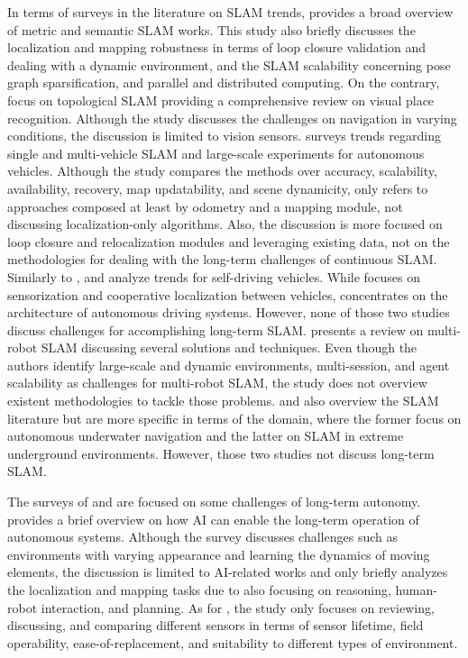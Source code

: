 In terms of surveys in the literature on SLAM trends, \cite{purpose:study:cadena:2016} provides a broad overview of metric and semantic SLAM works. This study also briefly discusses the localization and mapping robustness in terms of loop closure validation and dealing with a dynamic environment, and the SLAM scalability concerning pose graph sparsification, and parallel and distributed computing. On the contrary, \cite{purpose:study:lowry:2016} focus on topological SLAM providing a comprehensive review on visual place recognition. Although the study discusses the challenges on navigation in varying conditions, the discussion is limited to vision sensors.
\cite{purpose:study:bresson:2017} surveys trends regarding single and multi-vehicle SLAM and large-scale experiments for autonomous vehicles. Although the study compares the methods over accuracy, scalability, availability, recovery, map updatability, and scene dynamicity, \cite{purpose:study:bresson:2017} only refers to approaches composed at least by odometry and a mapping module, not discussing localization-only algorithms. Also, the discussion is more focused on loop closure and relocalization modules and leveraging existing data, not on the methodologies for dealing with the long-term challenges of continuous SLAM.
Similarly to \cite{purpose:study:bresson:2017}, \cite{purpose:study:kuutti:2018} and \cite{purpose:study:badue:2021} analyze trends for self-driving vehicles. While \cite{purpose:study:kuutti:2018} focuses on sensorization and cooperative localization between vehicles, \cite{purpose:study:badue:2021} concentrates on the architecture of autonomous driving systems. However, none of those two studies discuss challenges for accomplishing long-term SLAM.
\cite{purpose:study:saeedi:2016} presents a review on multi-robot SLAM discussing several solutions and techniques. Even though the authors identify large-scale and dynamic environments, multi-session, and agent scalability as challenges for multi-robot SLAM, the study does not overview existent methodologies to tackle those problems.
\cite{purpose:study:paull:2014} and \cite{purpose:study:ebadi} also overview the SLAM literature but are more specific in terms of the domain, where the former focus on autonomous underwater navigation and the latter on SLAM in extreme underground environments. However, those two studies not discuss long-term SLAM.

The surveys of \cite{purpose:study:kunze:2018} and \cite{purpose:study:zaffar:2018} are focused on some challenges of long-term autonomy. 
\cite{purpose:study:kunze:2018} provides a brief overview on how AI can enable the long-term operation of autonomous systems. Although the survey discusses challenges such as environments with varying appearance and learning the dynamics of moving elements, the discussion is limited to AI-related works and only briefly analyzes the localization and mapping tasks due to also focusing on reasoning, human-robot interaction, and planning.
As for \cite{purpose:study:zaffar:2018}, the study only focuses on reviewing, discussing, and comparing different sensors in terms of sensor lifetime, field operability, ease-of-replacement, and suitability to different types of environment.

